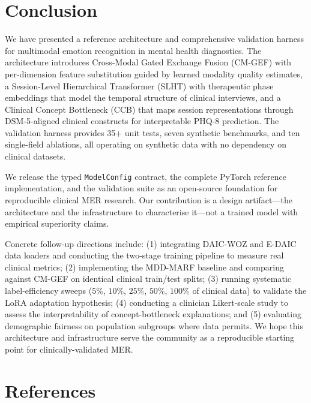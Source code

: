 \documentclass{article}
\begin{document}
\section{Conclusion}
\label{sec:conclusion}

We have presented a reference architecture and comprehensive validation harness for
multimodal emotion recognition in mental health diagnostics. The architecture introduces
Cross-Modal Gated Exchange Fusion (CM-GEF) with per-dimension feature substitution
guided by learned modality quality estimates, a Session-Level Hierarchical Transformer
(SLHT) with therapeutic phase embeddings that model the temporal structure of clinical
interviews, and a Clinical Concept Bottleneck (CCB) that maps session representations
through DSM-5-aligned clinical constructs for interpretable PHQ-8 prediction. The
validation harness provides 35+ unit tests, seven synthetic benchmarks, and ten
single-field ablations, all operating on synthetic data with no dependency on clinical
datasets.

We release the typed \texttt{ModelConfig} contract, the complete PyTorch reference
implementation, and the validation suite as an open-source foundation for reproducible
clinical MER research. Our contribution is a design artifact---the architecture and the
infrastructure to characterise it---not a trained model with empirical superiority claims.

Concrete follow-up directions include: (1) integrating DAIC-WOZ and E-DAIC data loaders
and conducting the two-stage training pipeline to measure real clinical metrics;
(2) implementing the MDD-MARF baseline and comparing against CM-GEF on identical
clinical train/test splits; (3) running systematic label-efficiency sweeps ($5\%$,
$10\%$, $25\%$, $50\%$, $100\%$ of clinical data) to validate the LoRA adaptation
hypothesis; (4) conducting a clinician Likert-scale study to assess the interpretability
of concept-bottleneck explanations; and (5) evaluating demographic fairness on
population subgroups where data permits. We hope this architecture and infrastructure
serve the community as a reproducible starting point for clinically-validated MER.




\section*{References}
\end{document}
